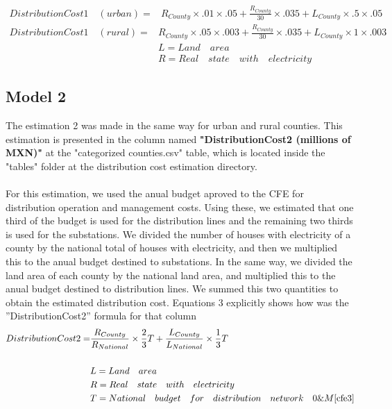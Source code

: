 \documentclass[•]{article}
\begin{document}
\begin{equation}
\begin{aligned}
DistributionCost1\quad (urban) = & R_{County} \times .01 \times .05 + \frac{R_{County}}{30} \times .035 + L_{County } \times .5 \times .05
\end{aligned}
\end{equation}
\begin{equation}
\begin{aligned}
DistributionCost1\quad (rural)= & R_{County} \times .05 \times .003 + \frac{R_{County}}{30} \times .035 + L_{County } \times 1 \times .003
\\& L = Land\quad area
\\& R = Real\quad state\quad with\quad electricity
\end{aligned}
\end{equation}
\subsection*{Model 2}
The estimation 2 was made in the same way for urban and rural counties. This estimation is presented in the column named \textbf{"DistributionCost2 (millions of MXN)"} at the "categorized counties.csv" table, which is located inside the "tables" folder at the distribution cost estimation directory.
\\
\\For this estimation, we used the anual budget aproved to the CFE for distribution operation and management costs\cite{cfe3}. Using these, we estimated that one third of the budget is used for the distribution lines and the remaining two thirds is used for the substations. We divided the number of houses with electricity of a county by the national total of houses with electricity, and then we multiplied this to the anual budget destined to substations. In the same way, we divided the land area of each county by the national land area, and multiplied this to the anual budget destined to distribution lines. We summed this two quantities to obtain the estimated distribution cost. Equations 3 explicitly shows how was the ''DistributionCost2'' formula for that column
\begin{equation}
\begin{aligned}
DistributionCost2 = & \frac{R_{County}}{R_{National}} \times \frac{2}{3} T + \frac{L_{County}}{L_{National}} \times \frac{1}{3} T 
\\
\\& L = Land\quad area
\\& R = Real\quad state\quad with\quad electricity
\\& T= National\quad budget\quad for\quad distribution\quad network\quad 0\&M\cite{cfe3}
\end{aligned}
\end{equation}
\end{document}
